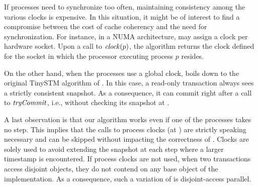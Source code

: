 If processes need to synchronize too often, maintaining consistency among the various clocks is expensive.
In this situation, it might be of interest to find a compromise between the cost of cache coherency and the need for synchronization.
For instance, in a NUMA architecture,  may assign a clock per hardware socket.
Upon a call to $\clockOf{p}$, the algorithm returns the clock defined for the socket in which the processor executing process $p$ resides.

On the other hand, when the processes use a global clock,  boils down to the original TinySTM algorithm of \citet{FelberFMR10}.
In this case, a read-only transaction always sees a strictly consistent snapshot.
As a consequence, it can commit right after a call to $\stmTryCommitFunction$, i.e., without checking its snapshot at .

A last observation is that our algorithm works even if one of the processes takes no step.
This implies that the calls to process clocks (at ) are strictly speaking necessary and can be skipped without impacting the correctness of .
Clocks are solely used to avoid extending the snapshot at each step where a larger timestamp is encountered.
If process clocks are not used, when two transactions access disjoint objects, they do not contend on any base object of the implementation.
As a consequence, such a variation of  is disjoint-access parallel.
